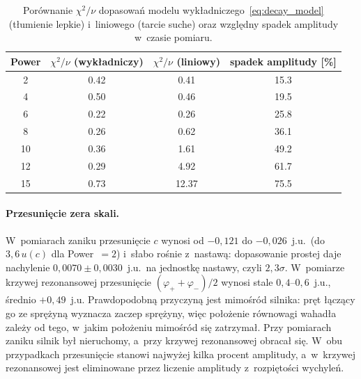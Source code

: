 \documentclass[12pt, a4paper]{article}
\begin{document}
\begin{table}[H]
    \centering
    \caption{Porównanie $\chi^2/\nu$ dopasowań modelu wykładniczego~\eqref{eq:decay_model}
             (tłumienie lepkie) i~liniowego (tarcie suche) oraz względny spadek
             amplitudy w~czasie pomiaru.}\label{tab:dry_friction}
    \begin{tabular}{S[table-format=2.0] S[table-format=1.2] S[table-format=2.2] S[table-format=2.1]}
        \toprule
        {Power} & {$\chi^2/\nu$ (wykładniczy)} & {$\chi^2/\nu$ (liniowy)}
        & {spadek amplitudy [\%]} \\
         & 0.42 & 0.41 & 15.3 \\
        4 & 0.50 & 0.46 & 19.5 \\
        6 & 0.22 & 0.26 & 25.8 \\
        8 & 0.26 & 0.62 & 36.1 \\
        10 & 0.36 & 1.61 & 49.2 \\
        12 & 0.29 & 4.92 & 61.7 \\
        15 & 0.73 & 12.37 & 75.5 \\
        \bottomrule
    \end{tabular}
\end{table}

\paragraph{Przesunięcie zera skali.}
W~pomiarach zaniku przesunięcie $c$ wynosi od $-0{,}121$ do $-0{,}026$~j.u.\
(do $3{,}6\,u(c)$ dla Power~$=2$) i~słabo rośnie z~nastawą: dopasowanie prostej daje
nachylenie $0{,}0070 \pm 0{,}0030$~j.u.\ na jednostkę nastawy, czyli $2{,}3\sigma$.
W~pomiarze krzywej rezonansowej przesunięcie $(\varphi_+ + \varphi_-)/2$ wynosi stale
$0{,}4$--$0{,}6$~j.u., średnio $+0{,}49$~j.u. Prawdopodobną przyczyną jest mimośród
silnika: pręt łączący go ze sprężyną wyznacza zaczep sprężyny, więc położenie
równowagi wahadła zależy od tego, w~jakim położeniu mimośród się zatrzymał. Przy
pomiarach zaniku silnik był nieruchomy, a~przy krzywej rezonansowej obracał się.
W~obu przypadkach przesunięcie stanowi najwyżej kilka procent amplitudy, a~w~krzywej
rezonansowej jest eliminowane przez liczenie amplitudy z~rozpiętości wychyleń.
\end{document}
